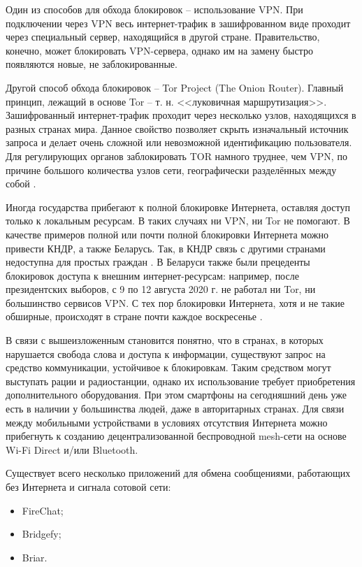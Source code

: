 Один из способов для обхода блокировок -- использование VPN.
При подключении через VPN весь интернет-трафик в зашифрованном виде проходит через специальный сервер, находящийся в другой стране.
Правительство, конечно, может блокировать VPN-сервера, однако им на замену быстро появляются новые, не заблокированные.

Другой способ обхода блокировок -- Tor Project (The Onion Router).
Главный принцип, лежащий в основе Tor -- т. н. <<луковичная маршрутизация>>.
Зашифрованный интернет-трафик проходит через несколько узлов, находящихся в разных странах мира.
Данное свойство позволяет скрыть изначальный источник запроса и делает очень сложной или невозможной идентификацию пользователя.
Для регулирующих органов заблокировать TOR намного труднее, чем VPN, по причине большого количества узлов сети, географически разделённых между собой \cite{tor_project}.

Иногда государства прибегают к полной блокировке Интернета, оставляя доступ только к локальным ресурсам.
В таких случаях ни VPN, ни Tor не помогают.
В качестве примеров полной или почти полной блокировки Интернета можно привести КНДР, а также Беларусь.
Так, в КНДР связь с другими странами недоступна для простых граждан \cite{amnesty_north_korea}.
В Беларуси также были прецеденты блокировок доступа к внешним интернет-ресурсам: например, после президентских выборов, с 9 по 12 августа 2020 г. не работал ни Tor, ни большинство сервисов VPN.
С тех пор блокировки Интернета, хотя и не такие обширные, происходят в стране почти каждое воскресенье \cite{hrw_belarus_censorship}.

В связи с вышеизложенным становится понятно, что в странах, в которых нарушается свобода слова и доступа к информации, существуют запрос на средство коммуникации, устойчивое к блокировкам.
Таким средством могут выступать рации и радиостанции, однако их использование требует приобретения дополнительного оборудования.
При этом смартфоны на сегодняшний день уже есть в наличии у большинства людей, даже в авторитарных странах.
Для связи между мобильными устройствами в условиях отсутствия Интернета можно прибегнуть к созданию децентрализованной беспроводной mesh-сети на основе Wi-Fi Direct и/или Bluetooth.

Существует всего несколько приложений для обмена сообщениями, работающих без Интернета и сигнала сотовой сети:
\begin{itemize}
	\item FireChat;
	\item Bridgefy;
	\item Briar.
\end{itemize}

